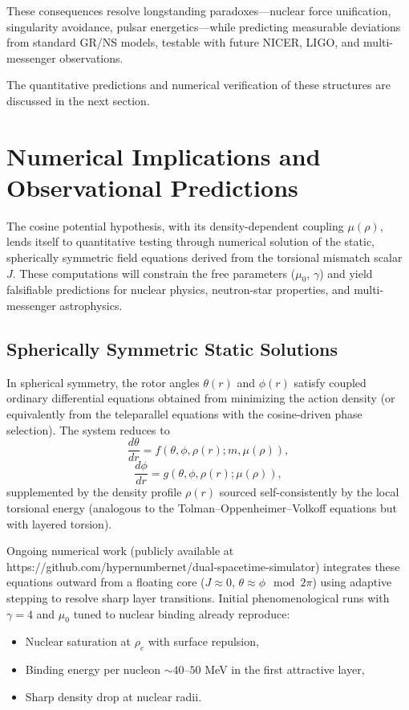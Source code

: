 \documentclass[a4paper]{article}
\begin{document}
These consequences resolve longstanding paradoxes—nuclear force unification, singularity avoidance, pulsar energetics—while predicting measurable deviations from standard GR/NS models, testable with future NICER, LIGO, and multi-messenger observations.

The quantitative predictions and numerical verification of these structures are discussed in the next section.

\section{Numerical Implications and Observational Predictions}
\label{sec:predictions}

The cosine potential hypothesis, with its density-dependent coupling $\mu(\rho)$, lends itself to quantitative testing through numerical solution of the static, spherically symmetric field equations derived from the torsional mismatch scalar $J$. These computations will constrain the free parameters ($\mu_0$, $\gamma$) and yield falsifiable predictions for nuclear physics, neutron-star properties, and multi-messenger astrophysics.

\subsection{Spherically Symmetric Static Solutions}

In spherical symmetry, the rotor angles $\theta(r)$ and $\phi(r)$ satisfy coupled ordinary differential equations obtained from minimizing the action density (or equivalently from the teleparallel equations with the cosine-driven phase selection). The system reduces to
\[
\frac{d\theta}{dr} = f(\theta, \phi, \rho(r); m, \mu(\rho)),
\]
\[
\frac{d\phi}{dr} = g(\theta, \phi, \rho(r); \mu(\rho)),
\]
supplemented by the density profile $\rho(r)$ sourced self-consistently by the local torsional energy (analogous to the Tolman--Oppenheimer--Volkoff equations but with layered torsion).

Ongoing numerical work (publicly available at https://github.com/hypernumbernet/dual-spacetime-simulator) integrates these equations outward from a floating core ($J \approx 0$, $\theta \approx \phi \mod 2\pi$) using adaptive stepping to resolve sharp layer transitions. Initial phenomenological runs with $\gamma = 4$ and $\mu_0$ tuned to nuclear binding already reproduce:
\begin{itemize}
  \item Nuclear saturation at $\rho_c$ with surface repulsion,
  \item Binding energy per nucleon $\sim 40$--$50$ MeV in the first attractive layer,
  \item Sharp density drop at nuclear radii.
\end{itemize}
\end{document}
